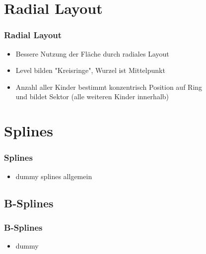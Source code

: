 \documentclass[11pt]{beamer}
\begin{document}
\section{Radial Layout}
\begin{frame}
\frametitle{Radial Layout}

\begin{itemize}
\item Bessere Nutzung der Fläche durch radiales Layout
\item Level bilden "Kreisringe", Wurzel ist Mittelpunkt
\item Anzahl aller Kinder bestimmt konzentrisch Position auf Ring 
\\ und bildet Sektor (alle weiteren Kinder innerhalb)
\end{itemize}


\end{frame}


\section{Splines}
\begin{frame}
\frametitle{Splines}

\begin{itemize}
\item dummy splines allgemein
\end{itemize}

\end{frame}



\subsection{B-Splines}
\begin{frame}
\frametitle{B-Splines}

\begin{itemize}
\item dummy
\end{itemize}

\end{frame}
\end{document}
